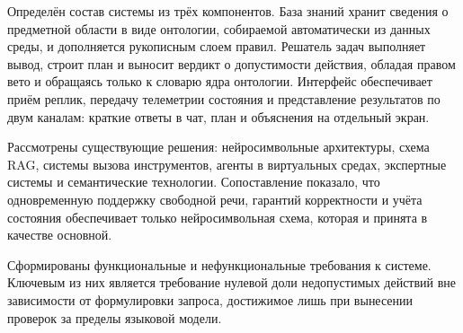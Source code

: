 Определён состав системы из трёх компонентов. База знаний хранит сведения о
предметной области в виде онтологии, собираемой автоматически из данных среды, и
дополняется рукописным слоем правил. Решатель задач выполняет вывод, строит план
и выносит вердикт о допустимости действия, обладая правом вето и обращаясь только
к словарю ядра онтологии. Интерфейс обеспечивает приём реплик, передачу телеметрии
состояния и представление результатов по двум каналам: краткие ответы в чат,
план и объяснения на отдельный экран.

Рассмотрены существующие решения: нейросимвольные архитектуры, схема RAG, системы
вызова инструментов, агенты в виртуальных средах, экспертные системы и семантические
технологии. Сопоставление показало, что одновременную поддержку свободной речи,
гарантий корректности и учёта состояния обеспечивает только нейросимвольная схема,
которая и принята в качестве основной.

Сформированы функциональные и нефункциональные требования к системе. Ключевым из
них является требование нулевой доли недопустимых действий вне зависимости от
формулировки запроса, достижимое лишь при вынесении проверок за пределы языковой
модели.

